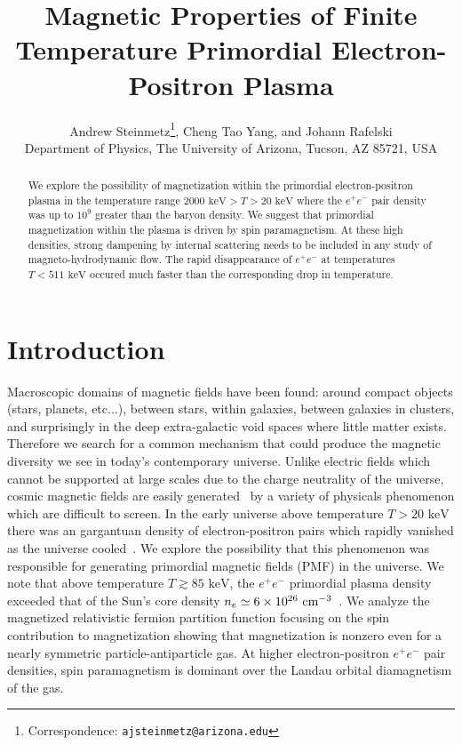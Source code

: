 \documentclass[a4paper]{article}
\title{\boldmath Magnetic Properties of Finite Temperature Primordial Electron-Positron Plasma}
\author{Andrew Steinmetz\orc{\orcC}\thanks{Correspondence: \texttt{ajsteinmetz@arizona.edu}}, Cheng Tao Yang\orc{\orcB}, and Johann Rafelski\orc{\orcA}\\ Department of Physics, The University of Arizona, Tucson, AZ 85721, USA}
\newcommand*{\keV}{\text{ keV}}
\begin{document}
\maketitle

\begin{abstract}
    We explore the possibility of magnetization within the primordial electron-positron plasma in the temperature range $2000\keV>T>20\keV$ where the $e^{+}e^{-}$ pair density was up to $10^{9}$ greater than the baryon density. We suggest that primordial magnetization within the plasma is driven by spin paramagnetism. At these high densities, strong dampening by internal scattering needs to be included in any study of magneto-hydrodynamic flow. The rapid disappearance of $e^{+}e^{-}$ at temperatures $T<511\keV$ occured much faster than the corresponding drop in temperature.
\end{abstract}


\section{Introduction}
\label{sec:introduction}
\noindent Macroscopic domains of magnetic fields have been found: around compact objects (stars, planets, etc...), between stars, within galaxies, between galaxies in clusters, and surprisingly in the deep extra-galactic void spaces where little matter exists. Therefore we search for a common mechanism that could produce the magnetic diversity we see in today's contemporary universe. Unlike electric fields which cannot be supported at large scales due to the charge neutrality of the universe, cosmic magnetic fields are easily generated~\cite{kronberg1994extragalactic} by a variety of physicals phenomenon which are difficult to screen. In the early universe above temperature $T>20\keV$ there was an gargantuan density of electron-positron pairs which rapidly vanished as the universe cooled~\cite{rafelski2023short}. We explore the possibility that this phenomenon was responsible for generating primordial magnetic fields (PMF) in the universe. We note that above temperature $T\gtrsim85\keV$, the $e^{+}e^{-}$ primordial plasma density exceeded that of the Sun's core density $n_{e}\simeq6\times10^{26}{\rm\ cm}^{-3}$~\cite{bahcall2001solar}. We analyze the magnetized relativistic fermion partition function focusing on the spin contribution to magnetization showing that magnetization is nonzero even for a nearly symmetric particle-antiparticle gas. At higher electron-positron $e^{+}e^{-}$ pair densities, spin paramagnetism is dominant over the Landau orbital diamagnetism of the gas.
\end{document}
